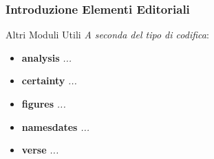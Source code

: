 \documentclass{beamer}
\begin{document}
    \begin{frame}
        \frametitle{Introduzione Elementi Editoriali}
        \addtocounter{nframe}{1}
        
        \begin{block}{Altri Moduli Utili}
           \textit{ A seconda del tipo di codifica}: 
           \begin{itemize}
               \item \textbf{analysis} \textit{...}
               \item \textbf{certainty} \textit{...}
               \item \textbf{figures} \textit{...}
               \item \textbf{namesdates} \textit{...}
               \item \textbf{verse} \textit{...}
           \end{itemize}
        \end{block}
        
    \end{frame}
    
        
    
            
        
\end{document}
